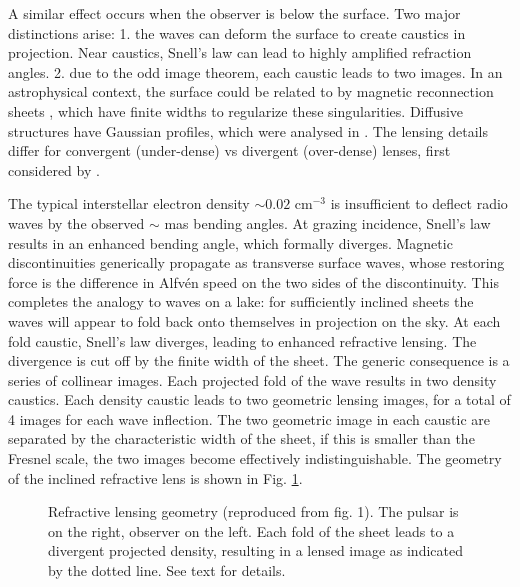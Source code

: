 \documentclass[useAMS,usenatbib]{mn2e}
\begin{document}
A similar effect occurs when the
observer is below the surface.  Two major distinctions arise: 1. the
waves can deform the surface to create caustics in projection. Near
caustics, Snell's law can lead to highly amplified refraction
angles\citep{2006ApJ...640L.159G}.  2. due to the odd image theorem, each caustic leads to two
images.  In an astrophysical context, the surface could be related to by magnetic reconnection
sheets \citep{2015MNRAS.450.3201B}, which have finite widths to
regularize these singularities. Diffusive structures have Gaussian
profiles, which were analysed in \citet{2012MNRAS.421L.132P}.  The
lensing details differ for convergent (under-dense) vs divergent
(over-dense) lenses, first considered by \citet{1998ApJ...496..253C}.



The typical interstellar electron density $\sim 0.02$ cm$^{-3}$ 
is insufficient to deflect
radio waves by the observed $\sim$ mas bending angles. At grazing
incidence, Snell's law results in an enhanced bending angle, which
formally diverges.  Magnetic discontinuities generically propagate
as transverse surface waves, whose restoring force is the difference in Alfv\'en
speed on the two sides of the discontinuity. This completes the
analogy to waves on a lake: for sufficiently inclined sheets the waves
will appear to fold back onto themselves in projection on the sky.  At
each fold caustic, Snell's law diverges, leading to enhanced
refractive lensing.  The divergence is cut off by the finite width of
the sheet.  The generic consequence is a series of collinear images.
Each projected fold of the wave results in two density caustics.  Each density
caustic leads to two geometric lensing images, for a total of 4 images
for each wave inflection.  The two geometric image in each caustic are
separated by the characteristic width of the sheet, if this is smaller
than the Fresnel scale, the two images become effectively
indistinguishable. 
The geometry of the inclined refractive lens is shown in Fig. \ref{fig:sheetgeom}.
\begin{figure}
\vspace{-0.5in}
\centerline{}
\vspace{-6.0in}
\caption{Refractive lensing geometry 
(reproduced from \citet{2014MNRAS.442.3338P}
  fig. 1).  The pulsar is on the right, observer on the left.  Each
  fold of the sheet leads to a divergent projected density, resulting
  in a lensed image as indicated by the dotted line. See text for details.
}
\label{fig:sheetgeom}
\end{figure}
\end{document}
